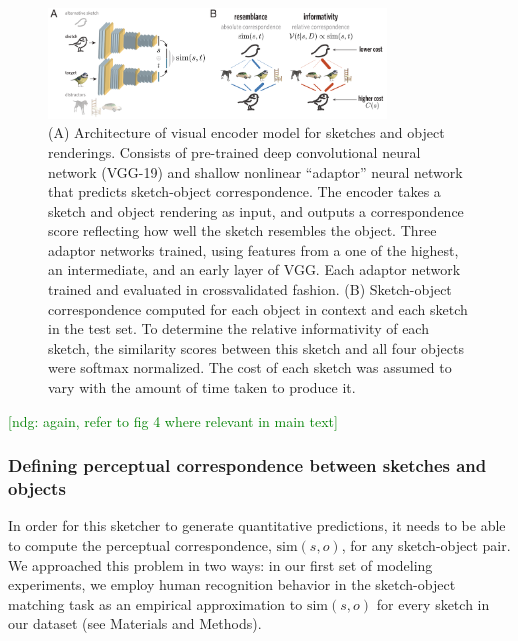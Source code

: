 \documentclass[9pt,twocolumn,twoside]{pnas-new}
\newcommand{\ndg}[1]{\textcolor{Green}{[ndg: #1]}}
\begin{document}
\begin{figure}[htbp]
\centering
\includegraphics[width=0.8\textwidth]{figures/4_model_schematic-min.pdf}
\caption{(A) Architecture of visual encoder model for sketches and object renderings. Consists of pre-trained deep convolutional neural network (VGG-19) and shallow nonlinear ``adaptor'' neural network that predicts sketch-object correspondence. 
The encoder takes a sketch and object rendering as input, and outputs a correspondence score reflecting how well the sketch resembles the object. 
Three adaptor networks trained, using features from a one of the highest, an intermediate, and an early layer of VGG.
Each adaptor network trained and evaluated in crossvalidated fashion. 
(B) Sketch-object correspondence computed for each object in context and each sketch in the test set. 
To determine the relative informativity of each sketch, the similarity scores between this sketch and all four objects were softmax normalized. 
The cost of each sketch was assumed to vary with the amount of time taken to produce it.}
\label{model_schematic}
\end{figure}
\ndg{again, refer to fig 4  where relevant in main text}

\subsubsection*{Defining perceptual correspondence between sketches and objects}

In order for this sketcher to generate quantitative predictions, it needs to be able to compute the perceptual correspondence, $\textrm{sim}(s,o)$, for any sketch-object pair. 
We approached this problem in two ways: in our first set of modeling experiments, we employ human recognition behavior in the sketch-object matching task as an empirical approximation to $\textrm{sim}(s,o)$ for every sketch in our dataset (see Materials and Methods). 
\end{document}
